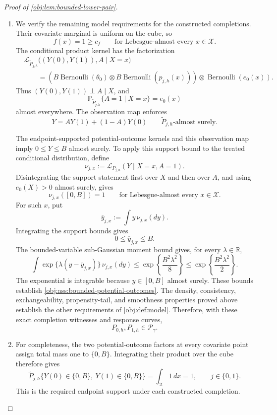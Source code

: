 \documentclass[11pt]{article}
\begin{document}
\begin{proof}[Proof of \cref{obj:lem:bounded-lower-pair}]
\begin{enumerate}
\item We verify the remaining model requirements for the constructed
completions. Their covariate marginal is uniform on the cube, so
\[
f(x)=1\ge c_f
\qquad\text{for Lebesgue-almost every }x\in\mathcal X.
\]
The conditional product kernel has the factorization
\[
\begin{aligned}
&\mathcal L_{\widetilde P_{j,h}}
   \bigl((Y(0),Y(1)),A\mid X=x\bigr)\\
&\qquad=
\left(
B\operatorname{Bernoulli}(\theta_0)
\otimes
B\operatorname{Bernoulli}(p_{j,h}(x))
\right)
\otimes\operatorname{Bernoulli}(e_0(x)).
\end{aligned}
\]
Thus \((Y(0),Y(1))\perp A\mid X\), and
\[
\mathbb P_{\widetilde P_{j,h}}\{A=1\mid X=x\}=e_0(x)
\]
almost everywhere. The observation map enforces
\[
Y=AY(1)+(1-A)Y(0)
\qquad\widetilde P_{j,h}\text{-almost surely}.
\]

The endpoint-supported potential-outcome kernels and this observation
map imply \(0\le Y\le B\) almost surely. To apply this support bound to
the treated conditional distribution, define
\[
\nu_{j,x}:=\mathcal L_{P_{j,h}}(Y\mid X=x,A=1).
\]
Disintegrating the support statement first over \(X\) and then over
\(A\), and using \(e_0(X)>0\) almost surely, gives
\[
\nu_{j,x}([0,B])=1
\qquad\text{for Lebesgue-almost every }x\in\mathcal X.
\]
For such \(x\), put
\[
\overline y_{j,x}:=\int y\,\nu_{j,x}(dy).
\]
Integrating the support bounds gives
\[
0\le\overline y_{j,x}\le B.
\]
The bounded-variable sub-Gaussian moment bound gives, for every
\(\lambda\in\mathbb R\),
\[
\int
\exp\{\lambda(y-\overline y_{j,x})\}\,\nu_{j,x}(dy)
\le
\exp\left\{\frac{B^2\lambda^2}{8}\right\}
\le
\exp\left\{\frac{B^2\lambda^2}{2}\right\}.
\]
The exponential is integrable because \(y\in[0,B]\) almost surely.
These bounds establish
\cref{obj:ass:bounded-potential-outcomes}. The density, consistency,
exchangeability, propensity-tail, and smoothness properties proved
above establish the other requirements of \cref{obj:def:model}.
Therefore, with these exact completion witnesses and response curves,
\[
P_{0,h},P_{1,h}\in\mathcal P_\gamma.
\]

\item For completeness, the two potential-outcome factors at every
covariate point assign total mass one to \(\{0,B\}\). Integrating their
product over the cube therefore gives
\[
\widetilde P_{j,h}
\{Y(0)\in\{0,B\},\ Y(1)\in\{0,B\}\}
=
\int_{\mathcal X}1\,dx
=1,
\qquad j\in\{0,1\}.
\]
This is the required endpoint support under each constructed completion.


\end{enumerate}
\end{proof}
\end{document}
